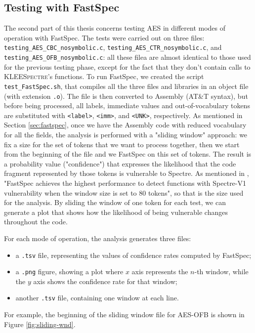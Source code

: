 \documentclass[12pt,a4paper]{book}
\theoremstyle{definition}
\begin{document}
	\subsection{Testing with FastSpec}
	The second part of this thesis concerns testing AES in different modes of operation with FastSpec. The tests were carried out on three files: \texttt{testing\_AES\_CBC\_nosymbolic.c}, \texttt{testing\_AES\_CTR\_nosymbolic.c}, and \texttt{testing\_AES\_OFB\_nosymbolic.c}: all these filea are almost identical to those used for the previous testing phase, except for the fact that they don't contain calls to \textsc{KLEESpectre}'s functions. To run FastSpec, we created the script \texttt{test\_FastSpec.sh}, that compiles all the three files and libraries in an object file (with extension \texttt{.o}). The file is then converted to Assembly (AT\&T syntax), but before being processed, all labels, immediate values and out-of-vocabulary tokens are substituted with \texttt{<label>}, \texttt{<imm>}, and \texttt{<UNK>}, respectively. As mentioned in Section \ref{sec:fastspec}, once we have the Assembly code with reduced vocabulary for all the fields, the analysis is performed with a "sliding window" approach: we fix a size for the set of tokens that we want to process together, then we start from the beginning of the file and we FastSpec on this set of tokens. The result is a probability value ("confidence") that expresses the likelihood that the code fragment represented by those tokens is vulnerable to Spectre. As mentioned in \cite{Tol2021}, "FastSpec achieves the highest performance to detect functions with Spectre-V1 vulnerability when the window size is set to 80 tokens", so that is the size used for the analysis. By sliding the window of one token for each test, we can generate a plot that shows how the likelihood of being vulnerable changes throughout the code. 
	
	For each mode of operation, the analysis generates three files:
	\begin{itemize}
		\item a \texttt{.tsv} file, representing the values of confidence rates computed by FastSpec;
		\item a \texttt{.png} figure, showing a plot where $x$ axis represents the $n$-th window, while the $y$ axis shows the confidence rate for that window;
		\item another \texttt{.tsv} file, containing one window at each line.
	\end{itemize}
	
	For example, the beginning of the sliding window file for AES-OFB is shown in Figure \ref{fig:sliding-wnd}.
	
\end{document}
